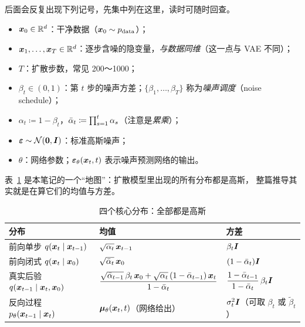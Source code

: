 后面会反复出现下列记号，先集中列在这里，读时可随时回查。

\begin{itemize}
  \item $\bm{x}_0\in\mathbb{R}^d$：干净数据（$\bm{x}_0\sim p_{\text{data}}$）；
  \item $\bm{x}_1,\dots,\bm{x}_T\in\mathbb{R}^d$：逐步含噪的隐变量，\emph{与数据同维}（这一点与 VAE 不同）；
  \item $T$：扩散步数，常见 200～1000；
  \item $\beta_t\in(0,1)$：第 $t$ 步的噪声方差；$\{\beta_1,\dots,\beta_T\}$ 称为\emph{噪声调度}（noise schedule）；
  \item $\alpha_t \coloneqq 1-\beta_t$，$\bar{\alpha}_t\coloneqq\prod_{s=1}^{t}\alpha_s$（注意是\emph{累乘}）；
  \item $\bm{\varepsilon}\sim\mathcal{N}(\bm{0},\bm{I})$：标准高斯噪声；
  \item $\theta$：网络参数；$\bm{\varepsilon}_\theta(\bm{x}_t,t)$ 表示噪声预测网络的输出。
\end{itemize}

表~\ref{tab:four-gaussians} 是本笔记的一个“地图”：扩散模型里出现的所有分布都是高斯，
整篇推导其实就是在算它们的均值与方差。

\begin{table}[htbp]
  \centering
  \caption{四个核心分布：全部都是高斯}
  \label{tab:four-gaussians}
  \small
  \renewcommand{\arraystretch}{1.9}
  \setlength{\tabcolsep}{5pt}
  \begin{tabular}{@{}p{4.4cm} p{5.4cm} p{3.0cm}@{}}
    \toprule
    分布 & 均值 & 方差 \\
    \midrule
    前向单步 $q(\bm{x}_t\mid\bm{x}_{t-1})$
      & $\sqrt{\alpha_t}\,\bm{x}_{t-1}$ & $\beta_t\bm{I}$ \\
    前向闭式 $q(\bm{x}_t\mid\bm{x}_0)$
      & $\sqrt{\bar{\alpha}_t}\,\bm{x}_0$ & $(1-\bar{\alpha}_t)\bm{I}$ \\
    真实后验 $q(\bm{x}_{t-1}\mid\bm{x}_t,\bm{x}_0)$
      & $\dfrac{\sqrt{\bar\alpha_{t-1}}\,\beta_t\,\bm{x}_0+\sqrt{\alpha_t}\,(1-\bar\alpha_{t-1})\,\bm{x}_t}{1-\bar{\alpha}_t}$
      & $\dfrac{1-\bar\alpha_{t-1}}{1-\bar{\alpha}_t}\,\beta_t\bm{I}$ \\
    反向过程 $p_\theta(\bm{x}_{t-1}\mid\bm{x}_t)$
      & $\bm{\mu}_\theta(\bm{x}_t,t)$（网络给出） & $\sigma_t^2\bm{I}$（可取 $\beta_t$ 或 $\tilde\beta_t$） \\
    \bottomrule
  \end{tabular}
\end{table}
